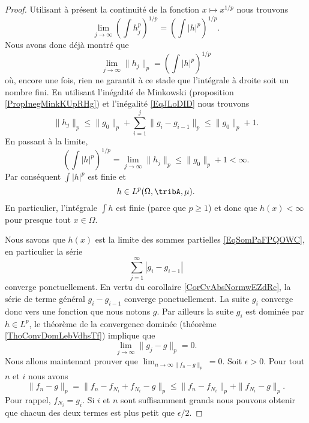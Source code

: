 \begin{proof}
    Utilisant à présent la continuité de la fonction \( x\mapsto x^{1/p}\) nous trouvons
    \begin{equation}
        \lim_{j\to \infty} \left( \int h_j^p \right)^{1/p}=\left( \int | h |^p \right)^{1/p}.
    \end{equation}
    Nous avons donc déjà montré que
    \begin{equation}
        \lim_{j\to \infty} \| h_j \|_p=\left( \int | h |^p \right)^{1/p}
    \end{equation}
    où, encore une fois, rien ne garantit à ce stade que l'intégrale à droite soit un nombre fini. En utilisant l'inégalité de Minkowski (proposition \ref{PropInegMinkKUpRHg}) et l'inégalité \eqref{EqJLoDID} nous trouvons
    \begin{equation}
        \|h_j\|_p\leq \|g_0\|_p+\sum_{i=1}^j\|g_i-g_{i-1}\|_p\leq \|g_0\|_p+1.
    \end{equation}
    En passant à la limite,
    \begin{equation}
        \left( \int| h |^p \right)^{1/p}=\lim_{j\to \infty}\|h_j\|_p \leq \|g_0\|_p+1<\infty.
    \end{equation}
    Par conséquent \( \int| h |^p\) est finie et
    \begin{equation}    \label{EqgLpdUPOBP}
        h\in L^p(\Omega,\tribA,\mu).
    \end{equation}
    En particulier, l'intégrale \( \int h\) est finie (parce que \( p\geq 1\)) et donc que \( h(x)<\infty\) pour presque tout \( x\in\Omega\).

    Nous savons que \( h(x)\) est la limite des sommes partielles \eqref{EqSomPaFPQOWC}, en particulier la série
    \begin{equation}
        \sum_{j=1}^{\infty}| g_i-g_{i-1} |
    \end{equation}
    converge ponctuellement. En vertu du corollaire \ref{CorCvAbsNormwEZdRc}, la série de terme général \( g_i-g_{i-1}\) converge ponctuellement. La suite \( g_i\) converge donc vers une fonction que nous notons \( g\). Par ailleurs la suite \( g_i\) est dominée par \( h\in L^p\), le théorème de la convergence dominée (théorème \ref{ThoConvDomLebVdhsTf}) implique que
    \begin{equation}
        \lim_{j\to \infty} \|g_j-g\|_p=0.
    \end{equation}
    Nous allons maintenant prouver que \( \lim_{n\to \infty\|f_n-g\|_p} =0\). Soit \( \epsilon>0\). Pour tout \( n\) et \( i\) nous avons
    \begin{equation}
        \|f_n-g\|_p=\|f_n-f_{N_i}+f_{N_i}-g\|_p\leq\|f_n-f_{N_i}\|_p+\|f_{N_i}-g\|_p.
    \end{equation}
    Pour rappel, \( f_{N_i}=g_i\). Si \(i\) et \( n\) sont suffisamment grands nous pouvons obtenir que chacun des deux termes est plus petit que \( \epsilon/2\).


\end{proof}
